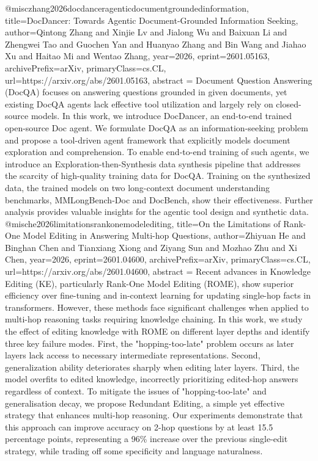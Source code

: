 {}@misc{zhang2026docdanceragenticdocumentgroundedinformation,
      title={DocDancer: Towards Agentic Document-Grounded Information Seeking}, 
      author={Qintong Zhang and Xinjie Lv and Jialong Wu and Baixuan Li and Zhengwei Tao and Guochen Yan and Huanyao Zhang and Bin Wang and Jiahao Xu and Haitao Mi and Wentao Zhang},
      year={2026},
      eprint={2601.05163},
      archivePrefix={arXiv},
      primaryClass={cs.CL},
      url={https://arxiv.org/abs/2601.05163},
      abstract = {Document Question Answering (DocQA) focuses on answering questions grounded in given documents, yet existing DocQA agents lack effective tool utilization and largely rely on closed-source models. In this work, we introduce DocDancer, an end-to-end trained open-source Doc agent. We formulate DocQA as an information-seeking problem and propose a tool-driven agent framework that explicitly models document exploration and comprehension. To enable end-to-end training of such agents, we introduce an Exploration-then-Synthesis data synthesis pipeline that addresses the scarcity of high-quality training data for DocQA. Training on the synthesized data, the trained models on two long-context document understanding benchmarks, MMLongBench-Doc and DocBench, show their effectiveness. Further analysis provides valuable insights for the agentic tool design and synthetic data.}
}@misc{he2026limitationsrankonemodelediting,
      title={On the Limitations of Rank-One Model Editing in Answering Multi-hop Questions}, 
      author={Zhiyuan He and Binghan Chen and Tianxiang Xiong and Ziyang Sun and Mozhao Zhu and Xi Chen},
      year={2026},
      eprint={2601.04600},
      archivePrefix={arXiv},
      primaryClass={cs.CL},
      url={https://arxiv.org/abs/2601.04600},
      abstract = {Recent advances in Knowledge Editing (KE), particularly Rank-One Model Editing (ROME), show superior efficiency over fine-tuning and in-context learning for updating single-hop facts in transformers. However, these methods face significant challenges when applied to multi-hop reasoning tasks requiring knowledge chaining. In this work, we study the effect of editing knowledge with ROME on different layer depths and identify three key failure modes. First, the "hopping-too-late" problem occurs as later layers lack access to necessary intermediate representations. Second, generalization ability deteriorates sharply when editing later layers. Third, the model overfits to edited knowledge, incorrectly prioritizing edited-hop answers regardless of context. To mitigate the issues of "hopping-too-late" and generalisation decay, we propose Redundant Editing, a simple yet effective strategy that enhances multi-hop reasoning. Our experiments demonstrate that this approach can improve accuracy on 2-hop questions by at least 15.5 percentage points, representing a 96\% increase over the previous single-edit strategy, while trading off some specificity and language naturalness.}
}
